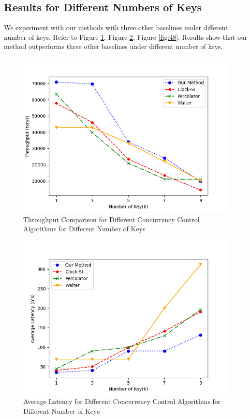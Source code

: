 \subsection{Results for Different Numbers of Keys}

We experiment with our methods with three other baselines under different number of keys. Refer to Figure \ref{fig:46}, Figure \ref{fig:47}, Figure \ref{fig:48}. Results show that our method outperforms three other baselines under different number of keys.

\begin{figure}[H]
    \centering
    \includegraphics[width=0.8\linewidth]{figure/46.png}
    \caption{Throughput Comparison for Different Concurrency Control Algorithms for Different Number of Keys}
    \label{fig:46}
\end{figure}
\begin{figure}[H]
    \centering
    \includegraphics[width=0.8\linewidth]{figure/47.png}
    \caption{Average Latency for Different Concurrency Control Algorithms for Different Number of Keys}
    \label{fig:47}
\end{figure}
